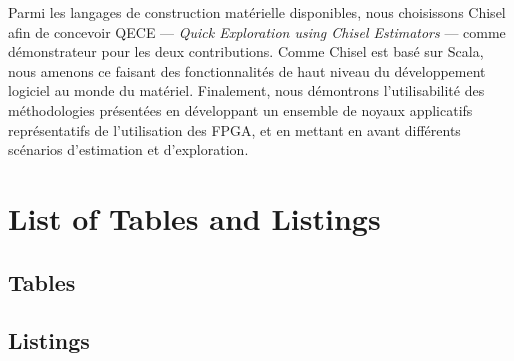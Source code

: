 {Parmi les langages de construction matérielle disponibles, nous choisissons Chisel afin de concevoir QECE --- {\it Quick Exploration using Chisel Estimators} --- comme démonstrateur pour les deux contributions.
Comme Chisel est basé sur Scala, nous amenons ce faisant des fonctionnalités de haut niveau du développement logiciel au monde du matériel.
Finalement, nous démontrons l'utilisabilité des méthodologies présentées en développant un ensemble de noyaux applicatifs représentatifs de l'utilisation des FPGA, et en mettant en avant différents scénarios d'estimation et d'exploration.

}

{}
\setcounter{tocdepth}{1}
\dominitoc \tableofcontents

\clearpage
{}
{}
\dominilof 
\listoffigures


\clearpage
\begingroup
\makeatletter
{}
{}
\chapter*{\hspace{-2cm}List of Tables and Listings}
\section*{Tables}
\let\clearpage\relax
\section*{Listings}
\let\clearpage\relax
\makeatother
\endgroup
\clearpage

\pagestyle{empty}
